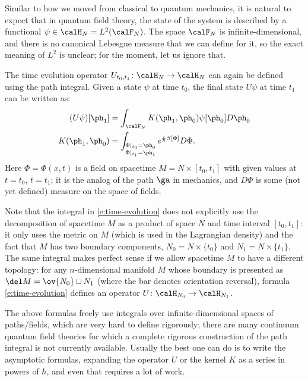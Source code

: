 
Similar to how we moved from classical to quantum mechanics, it is natural to
expect that in quantum field theory, the state of the system is described by a
functional $\psi \in \calH_N = L^2(\calF_N)$. The space $\calF_N$ is
infinite-dimensional, and there is no canonical Lebesgue measure that we can
define for it, so the exact meaning of $L^2$ is unclear; for the
moment, let us ignore that.


The time evolution operator $U_{t_0,t_1}\colon \calH_N \rightarrow \calH_N$
can again be defined using the path integral.
Given a state $\psi$ at time $t_0$, the final state $U\psi$ at time $t_1$
can be written as:
\begin{equation}\label{e:time-evolution}
  \begin{aligned}
	(U \psi)[\ph_1] &= \int_{\calF_N} K(\ph_1,\ph_0) \psi[\ph_0] D \ph_0\\
	K(\ph_1,\ph_0) &= \int_{\substack{\Phi|_{t_0}
  =\ph_0 \\ \Phi|_{t_1}=\ph_1}} e^{\frac{i}{\hbar} S[\Phi]} D\Phi.
  \end{aligned}
\end{equation}
Here $\Phi=\Phi(x,t)$ is a field on spacetime $M=N\times[t_0,t_1]$ with given
values at $t=t_0$, $t=t_1$; it is the analog of the path $\ga$ in mechanics, and
$D\Phi$ is some (not yet defined) measure on the space of fields.


Note that the integral in \eqref{e:time-evolution} does not explicitly use the
decomposition of spacetime $M$ as a product of space $N$ and time interval
$[t_0, t_1]$: it only uses the metric on $M$ (which is used in the Lagrangian
density) and the fact that $M$ has two boundary components, $N_0=N\times\{t_0\}$
and $N_1 = N\times \{t_1\}$. The same integral makes perfect sense if we allow
spacetime $M$ to have a different topology: for any $n$-dimensional manifold $M$
whose boundary is presented as $\del M=\ov{N_0}\sqcup N_1$ (where the bar
denotes orientation reversal), formula \eqref{e:time-evolution} defines an
operator $U\colon \calH_{N_0}\to \calH_{N_1}$.



The above formulas freely use integrals over infinite-dimensional spaces of
paths/fields, which are very hard to define rigorously; there are many
continuum quantum field theories for which a complete rigorous construction of
the path integral is not currently available. Usually the best one can do is to
write the asymptotic formulas, expanding the operator $U$ or the kernel $K$ as
a series in powers of $\hbar$, and even that requires a lot of work.

